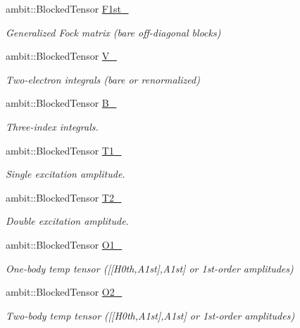 \begin{DoxyCompactItemize}
ambit\+::\+Blocked\+Tensor \mbox{\hyperlink{classforte_1_1_d_s_r_g___m_r_p_t3_a078a80b254310fde8b5f0f4dec0d316d}{F1st\+\_\+}}
\begin{DoxyCompactList}\small\item\em Generalized Fock matrix (bare off-\/diagonal blocks) \end{DoxyCompactList}\item 
ambit\+::\+Blocked\+Tensor \mbox{\hyperlink{classforte_1_1_d_s_r_g___m_r_p_t3_a4df42fb2007964419b78dcde72886db8}{V\+\_\+}}
\begin{DoxyCompactList}\small\item\em Two-\/electron integrals (bare or renormalized) \end{DoxyCompactList}\item 
ambit\+::\+Blocked\+Tensor \mbox{\hyperlink{classforte_1_1_d_s_r_g___m_r_p_t3_ad2075beaa4159ef620f34df0fc5fdd64}{B\+\_\+}}
\begin{DoxyCompactList}\small\item\em Three-\/index integrals. \end{DoxyCompactList}\item 
ambit\+::\+Blocked\+Tensor \mbox{\hyperlink{classforte_1_1_d_s_r_g___m_r_p_t3_aa7a1ae6e6db9791b3dc40052ef0d1af5}{T1\+\_\+}}
\begin{DoxyCompactList}\small\item\em Single excitation amplitude. \end{DoxyCompactList}\item 
ambit\+::\+Blocked\+Tensor \mbox{\hyperlink{classforte_1_1_d_s_r_g___m_r_p_t3_ab74e92a4d965c40a6d2a6f1a0afceea2}{T2\+\_\+}}
\begin{DoxyCompactList}\small\item\em Double excitation amplitude. \end{DoxyCompactList}\item 
ambit\+::\+Blocked\+Tensor \mbox{\hyperlink{classforte_1_1_d_s_r_g___m_r_p_t3_aec8b24da0956caeaed744b78d132a9ef}{O1\+\_\+}}
\begin{DoxyCompactList}\small\item\em One-\/body temp tensor (\mbox{[}\mbox{[}H0th,A1st\mbox{]},A1st\mbox{]} or 1st-\/order amplitudes) \end{DoxyCompactList}\item 
ambit\+::\+Blocked\+Tensor \mbox{\hyperlink{classforte_1_1_d_s_r_g___m_r_p_t3_aafc09e3bcf2969a8c54cd80611f22615}{O2\+\_\+}}
\begin{DoxyCompactList}\small\item\em Two-\/body temp tensor (\mbox{[}\mbox{[}H0th,A1st\mbox{]},A1st\mbox{]} or 1st-\/order amplitudes) \end{DoxyCompactList}\item 

\end{DoxyCompactItemize}
